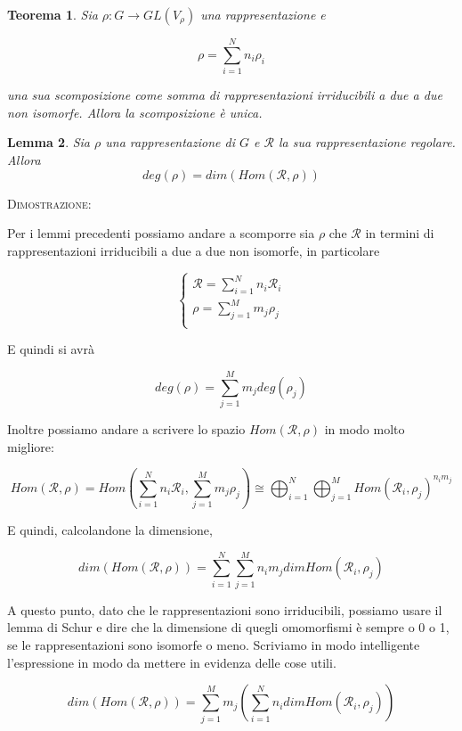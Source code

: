 \documentclass[11pt]{article}
\theoremstyle{plain}
\newtheorem{thm}{Teorema}[section]
\newtheorem{lemma}[thm]{Lemma}
\theoremstyle{definition}
\theoremstyle{remark}
\newcommand{\dsum}{\displaystyle\sum}
\begin{document}
\begin{thm}
Sia $\rho: G \to GL(V_\rho)$ una rappresentazione e 

\[\rho = \dsum_{i=1}^N n_i \rho_i \]

una sua scomposizione come somma di rappresentazioni irriducibili a due a due non isomorfe. Allora la scomposizione è unica.
\end{thm}



\begin{lemma}
Sia $\rho$ una rappresentazione di $G$ e $\mathcal{R}$ la sua rappresentazione regolare. Allora 
\[deg(\rho) = dim(Hom(\mathcal{R}, \rho))\]
\end{lemma}



\textsc{Dimostrazione:}

Per i lemmi precedenti possiamo andare a scomporre sia $\rho$ che $\mathcal{R}$ in termini di rappresentazioni irriducibili a due a due non isomorfe, in particolare


\[ 
\begin{cases}
\mathcal{R} = \dsum_{i = 1}^N n_i \mathcal{R}_i \\
\rho = \dsum_{j = 1}^M m_j \rho_j \\
\end{cases}
\]


E quindi si avrà 

\[ deg(\rho) =  \dsum_{j = 1}^M m_j deg(\rho_j) \]

Inoltre possiamo andare a scrivere lo spazio $Hom(\mathcal{R}, \rho)$ in modo molto migliore:


\[Hom(\mathcal{R}, \rho) = Hom\left( \dsum_{i = 1}^N n_i \mathcal{R}_i , \dsum_{j = 1}^M m_j \rho_j \right) \cong \bigoplus_{i = 1}^N \bigoplus_{j=1}^M Hom(\mathcal{R}_i , \rho_j) ^{n_im_j}\]

E quindi, calcolandone la dimensione,


\[ dim (Hom(\mathcal{R}, \rho)) = \dsum_{i=1}^N \dsum_{j=1}^M n_im_j dim Hom(\mathcal{R}_i, \rho_j) \]

A questo punto, dato che le rappresentazioni sono irriducibili, possiamo usare il lemma di Schur e dire che la dimensione di quegli omomorfismi è sempre o 0 o 1, se le rappresentazioni sono isomorfe o meno. Scriviamo in modo intelligente l'espressione in modo da mettere in evidenza delle cose utili.



\[ dim (Hom(\mathcal{R}, \rho)) = \dsum_{j = 1}^M m_j \left( \dsum_{i = 1}^N n_i dimHom(\mathcal{R}_i, \rho_j)\right)\]
\end{document}
